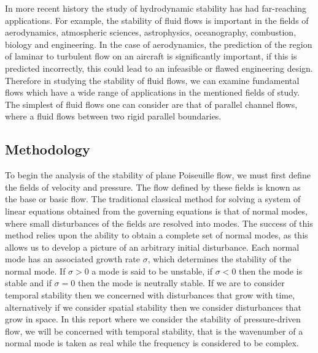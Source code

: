 \documentclass[a4paper, 12pt, twoside, openright]{article}
\numberwithin{equation}{section}
\begin{document}

In more recent history the study of hydrodynamic stability has had far-reaching applications. For example, the stability of fluid flows is important in the fields of aerodynamics, atmospheric sciences, astrophysics, oceanography, combustion, biology and engineering. In the case of aerodynamics, the prediction of the region of laminar to turbulent flow on an aircraft is significantly important, if this is predicted incorrectly, this could lead to an infeasible or flawed engineering design. Therefore in studying the stability of fluid flows, we can examine fundamental flows which have a wide range of applications in the mentioned fields of study. The simplest of fluid flows one can consider are that of parallel channel flows, where a fluid flows between two rigid parallel boundaries. %

\subsection{Methodology}
To begin the analysis of the stability of plane Poiseuille flow, we must first define the fields of velocity and pressure. The flow defined by these fields is known as the base or basic flow. The traditional classical method for solving a system of linear equations obtained from the governing equations is that of normal modes, where small disturbances of the fields are resolved into modes. The success of this method relies upon the ability to obtain a complete set of normal modes, as this allows us to develop a picture of an arbitrary initial disturbance. Each normal mode has an associated growth rate $\sigma$, which determines the stability of the normal mode. If $\sigma>0$ a mode is said to be unstable, if $\sigma<0$ then the mode is stable and if $\sigma=0$ then the mode is neutrally stable. If we are to consider temporal stability then we concerned with disturbances that grow with time, alternatively if we consider spatial stability then we consider disturbances that grow in space. In this report where we consider the stability of pressure-driven flow, we will be concerned with temporal stability, that is the wavenumber of a normal mode is taken as real while the frequency is considered to be complex. %
\end{document}
